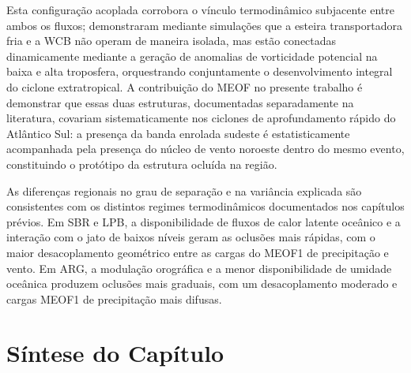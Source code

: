 Esta configuração acoplada corrobora o vínculo termodinâmico subjacente entre ambos os fluxos; \citet{schemm2014ccb} demonstraram mediante simulações que a esteira transportadora fria e a WCB não operam de maneira isolada, mas estão conectadas dinamicamente mediante a geração de anomalias de vorticidade potencial na baixa e alta troposfera, orquestrando conjuntamente o desenvolvimento integral do ciclone extratropical. 
A contribuição do MEOF no presente trabalho é demonstrar que essas duas estruturas, documentadas separadamente na literatura, covariam sistematicamente nos ciclones de aprofundamento rápido do Atlântico Sul: a presença da banda enrolada sudeste é estatisticamente acompanhada pela presença do núcleo de vento noroeste dentro do mesmo evento, constituindo o protótipo da estrutura ocluída na região.

As diferenças regionais no grau de separação e na variância explicada são consistentes com os distintos regimes termodinâmicos documentados nos capítulos prévios. Em SBR e LPB, a disponibilidade de fluxos de calor latente oceânico e a interação com o jato de baixos níveis \citep{gramcianinov2019properties} geram as oclusões mais rápidas, com o maior desacoplamento geométrico entre as cargas do MEOF1 de precipitação e vento. Em ARG, a modulação orográfica e a menor disponibilidade de umidade oceânica produzem oclusões mais graduais, com um desacoplamento moderado e cargas MEOF1 de precipitação mais difusas. 


\section{Síntese do Capítulo}
\label{sec:sintesis_meof}

